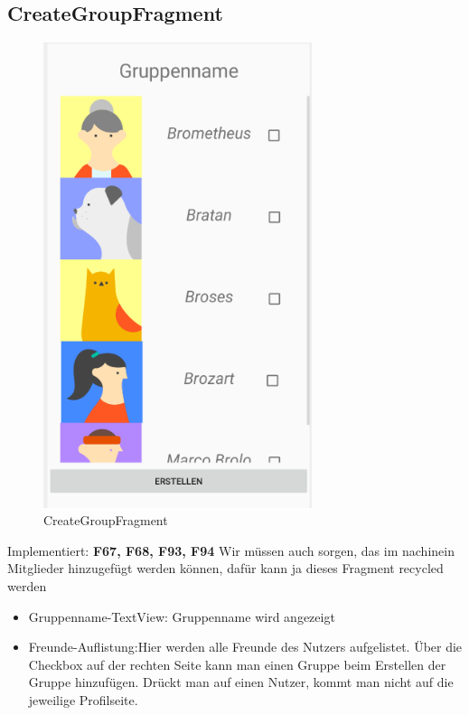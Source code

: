 \subsection{CreateGroupFragment}
\begin{figure}[H]
	\centering
	\includegraphics[width=0.7\textwidth]{pics/createGroupFragment.png}%
	\caption{CreateGroupFragment}%
	\label{view}%
\end{figure}
Implementiert: \textbf{F67, F68, F93, F94}
Wir müssen auch sorgen, das im nachinein Mitglieder hinzugefügt werden können, dafür kann ja dieses Fragment recycled werden
\begin{itemize}[nosep]
	\item Gruppenname-TextView: Gruppenname wird angezeigt
	\item Freunde-Auflistung:Hier werden alle Freunde des Nutzers aufgelistet. Über die Checkbox auf der rechten Seite kann man einen Gruppe beim Erstellen der Gruppe hinzufügen. Drückt man auf einen Nutzer, kommt man nicht auf die jeweilige Profilseite.
\end{itemize}

